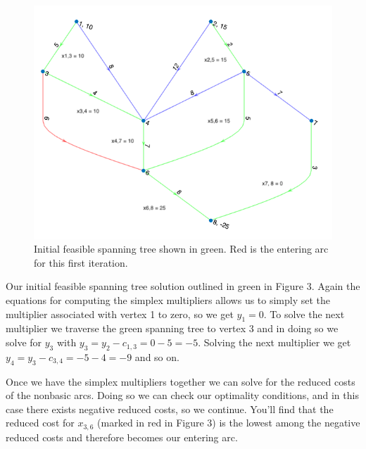\documentclass[12pt]{amsart}
\begin{document}
\begin{figure}
    \includegraphics[width=.80\textwidth]{step1.png}  %
    \caption{Initial feasible spanning tree shown in green. Red is the entering arc for this first iteration.}
    \end{figure}
    Our initial feasible spanning tree solution outlined in green in Figure 3. Again the equations for computing the simplex multipliers allows us to simply set 
    the multiplier associated with vertex 1 to zero, so we get $y_1 = 0$. To solve the next multiplier we traverse the green spanning tree to vertex 3 and in doing so we solve 
    for $y_3$ with $y_3 = y_2 - c_{1,3} = 0-5 = -5$. Solving the next multiplier we get $y_4 = y_3 - c_{3, 4} = -5 - 4 = -9$ and so on. 

    Once we have the simplex multipliers together we can solve for the reduced costs of the nonbasic arcs. Doing so we can check our optimality conditions, and in this 
    case there exists negative reduced costs, so we continue. You'll find that the reduced cost for $x_{3, 6}$ (marked in red in Figure 3) is the lowest among the negative reduced costs and therefore becomes our 
    entering arc. 
\end{document}
